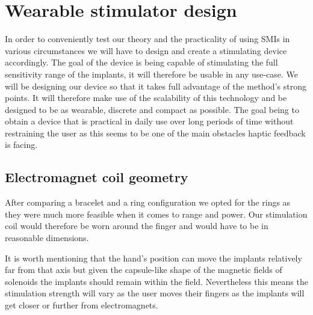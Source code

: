 \documentclass[10pt,journal,compsoc]{IEEEtran}
\begin{document}
\section{Wearable stimulator design}
In order to conveniently test our theory and the practicality of using SMIs in various circumstances we will have to design and create a stimulating device accordingly. The goal of the device is being capable of stimulating the full sensitivity range of the implants, it will therefore be usable in any use-case.
We will be designing our device so that it takes full advantage of the method's strong points. It will therefore make use of the scalability of this technology and be designed to be as wearable, discrete and compact as possible. The goal being to obtain a device that is practical in daily use over long periods of time without restraining the user as this seems to be one of the main obstacles haptic feedback is facing.
	\subsection{Electromagnet coil geometry}
	
	After comparing a bracelet and a ring configuration we opted for the rings as they were much more feasible when it comes to range and power. Our stimulation coil would therefore be worn around the finger and would have to be in reasonable dimensions.
	
	It is worth mentioning that the hand's position can move the implants relatively far from that axis but given the capsule-like shape of the magnetic fields of solenoids the implants should remain within the field. Nevertheless this means the stimulation strength will vary as the user moves their fingers as the implants will get closer or further from electromagnets.
	
\end{document}
